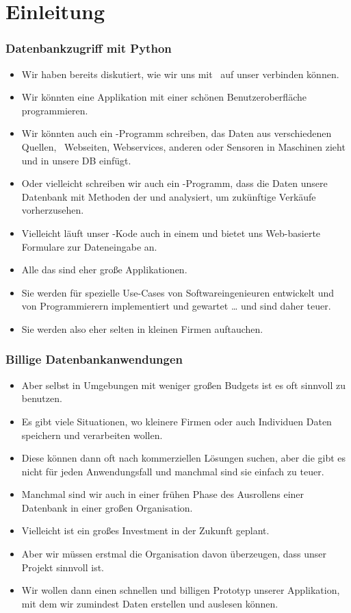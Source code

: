 \documentclass[aspectratio=169,mathserif,notheorems]{beamer}%
\subtitle{18.~Fabrik-Datenbank:~LibreOffice Base mit PostgreSQL verbinden}%
\begin{document}
%
%
\startPresentation%
%
\section{Einleitung}%
%
\begin{frame}%
\frametitle{Datenbankzugriff mit Python}%
%
\begin{itemize}%
\item Wir haben bereits diskutiert, wie wir uns mit \python\ auf unser  verbinden können.%
%
\item<2-> Wir könnten eine Applikation mit einer schönen Benutzeroberfläche programmieren.%
%
\item<3-> Wir könnten auch ein \python-Programm schreiben, das Daten aus verschiedenen Quellen, \DEzB\ Webseiten, Webservices, anderen  oder Sensoren in Maschinen zieht und in unsere DB einfügt.%
%
\item<4-> Oder vielleicht schreiben wir auch ein \python-Programm, dass die Daten unsere Datenbank mit Methoden der  und  analysiert, um zukünftige Verkäufe vorherzusehen.%
%
\item<5-> Vielleicht läuft unser \python-Kode auch in einem  und bietet uns Web-basierte Formulare zur Dateneingabe an.%
%
\item<6-> Alle das sind eher große Applikationen.%
%
\item<7-> Sie werden für spezielle Use-Cases von Softwareingenieuren entwickelt und von Programmierern implementiert und gewartet {\dots} und sind daher teuer.%
%
\item<8-> Sie werden also eher selten in kleinen Firmen auftauchen.%
\end{itemize}%
\end{frame}%
%
%
\begin{frame}%
\frametitle{Billige Datenbankanwendungen}%
%
\begin{itemize}%
\item Aber selbst in Umgebungen mit weniger großen Budgets ist es oft sinnvoll  zu benutzen.%
%
\item<2-> Es gibt viele Situationen, wo kleinere Firmen oder auch Individuen Daten speichern und verarbeiten wollen.%
%
\item<3-> Diese können dann oft nach kommerziellen Lösungen suchen, aber die gibt es nicht für jeden Anwendungsfall und manchmal sind sie einfach zu teuer.%
%
\item<4-> Manchmal sind wir auch in einer frühen Phase des Ausrollens einer Datenbank in einer großen Organisation.%
%
\item<5-> Vielleicht ist ein großes Investment in der Zukunft geplant.%
%
\item<6-> Aber wir müssen erstmal die Organisation davon überzeugen, dass unser Projekt sinnvoll ist.%
%
\item<7-> Wir wollen dann einen schnellen und billigen Prototyp unserer Applikation, mit dem wir zumindest Daten erstellen und auslesen können.%
\end{itemize}%
\end{frame}%
\end{document}
